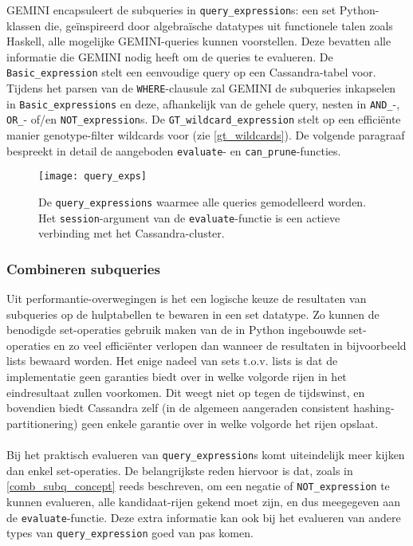 GEMINI encapsuleert de subqueries in \texttt{query\_expression}s: een set Python-klassen die, ge\"inspireerd door algebra\"ische datatypes uit functionele talen zoals Haskell, alle mogelijke GEMINI-queries kunnen voorstellen. Deze bevatten alle informatie die GEMINI nodig heeft om de queries te evalueren. De \texttt{Basic\_expression} stelt een eenvoudige query op een Cassandra-tabel voor. Tijdens het parsen van de \texttt{WHERE}-clausule zal GEMINI de subqueries inkapselen in \texttt{Basic\_expressions} en deze, afhankelijk van de gehele query, nesten in \texttt{AND\_}-, \texttt{OR\_}- of/en \texttt{NOT\_expression}s. De \texttt{GT\_wildcard\_expression} stelt op een effici\"ente manier genotype-filter wildcards voor (zie \ref{gt_wildcards}). De volgende paragraaf bespreekt in detail de aangeboden \texttt{evaluate}- en \texttt{can\_prune}-functies.

\begin{figure}[h]
\texttt{[image: query\_exps]}
\caption{De \texttt{query\_expressions} waarmee alle queries gemodelleerd worden. Het \texttt{session}-argument van de \texttt{evaluate}-functie is een actieve verbinding met het Cassandra-cluster.}
\label{query_exps_diagram}
\end{figure}

\subsubsection{Combineren subqueries}

Uit performantie-overwegingen is het een logische keuze de resultaten van subqueries op de hulptabellen te bewaren in een set datatype. Zo kunnen de benodigde set-operaties gebruik maken van de in Python ingebouwde set-operaties en zo veel effici\"enter verlopen dan wanneer de resultaten in bijvoorbeeld lists bewaard worden. Het enige nadeel van sets t.o.v. lists is dat de implementatie geen garanties biedt over in welke volgorde rijen in het eindresultaat zullen voorkomen. Dit weegt niet op tegen de tijdswinst, en bovendien biedt Cassandra zelf (in de algemeen aangeraden consistent hashing-partitionering) geen enkele garantie over in welke volgorde het rijen opslaat.\\\\
Bij het praktisch evalueren van \texttt{query\_expression}s komt uiteindelijk meer kijken dan enkel set-operaties. De belangrijkste reden hiervoor is dat, zoals in \ref{comb_subq_concept} reeds beschreven, om een negatie of \texttt{NOT\_expression} te kunnen evalueren, alle kandidaat-rijen gekend moet zijn, en dus meegegeven aan de \texttt{evaluate}-functie. Deze extra informatie kan ook bij het evalueren van andere types van \texttt{query\_expression} goed van pas komen.
 
